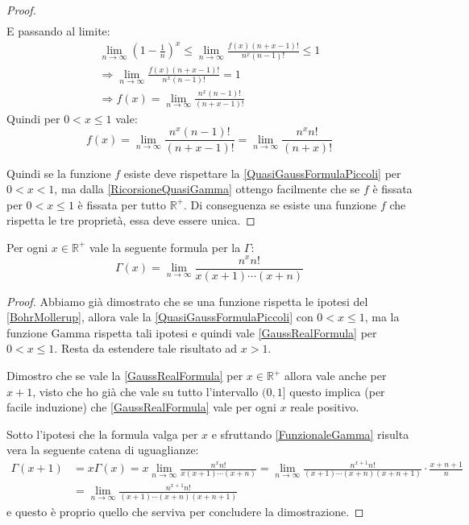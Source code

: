 \begin{proof}
\begin{gather*}
	\end{gather*}
	E passando al limite:
	\begin{gather*}
		\lim_{n\to \infty} \left(1-\frac{1}{n}\right)^x \le \lim_{n\to \infty}  \frac{f(x)(n+x-1)!}{n^x(n-1)!} \le 1 \\
		\Longrightarrow \lim_{n\to \infty} \frac{f(x)(n+x-1)!}{n^x(n-1)!}  = 1 \\
		\Longrightarrow f(x) = \lim_{n\to \infty} \frac{n^x(n-1)!}{(n+x-1)!}
	\end{gather*}
	Quindi per $0<x\le 1$ vale:
	\begin{equation}\label{QuasiGaussFormulaPiccoli}
		f(x)=\lim_{n\to \infty} \frac{n^x(n-1)!}{(n+x-1)!}=\lim_{n\to \infty} \frac{n^xn!}{(n+x)!}
	\end{equation}
	
	Quindi se la funzione $f$ esiste deve rispettare la \cref{QuasiGaussFormulaPiccoli} per $0<x<1$, ma dalla \cref{RicorsioneQuasiGamma} 
	ottengo facilmente che se $f$ è fissata per $0<x\le 1$ è fissata per tutto $\mathbb{R^+}$.
	Di conseguenza se esiste una funzione $f$ che rispetta le tre proprietà, essa deve essere unica.
\end{proof}
 
\begin{corollary}\label{GaussFormula}
        Per ogni $x\in\mathbb{R^+}$ vale la seguente formula per la $\Gamma$:
\begin{equation}\label{GaussRealFormula}
        \Gamma(x)=\lim_{n\to \infty} \frac{n^xn!}{x(x+1)\cdots(x+n)}
\end{equation}
\end{corollary}
\begin{proof}
        Abbiamo già dimostrato che se una funzione rispetta le ipotesi del \cref{BohrMollerup}, allora vale la
        \cref{QuasiGaussFormulaPiccoli} con $0<x\le 1$, ma la funzione Gamma rispetta tali ipotesi e quindi vale \cref{GaussRealFormula}
        per $0<x\le 1$.
        Resta da estendere tale risultato ad $x>1$.
        
        Dimostro che se vale la \cref{GaussRealFormula} per $x\in\mathbb{R^+}$ allora vale anche per $x+1$, visto che ho già che vale
        su tutto l'intervallo $(0,1]$ questo implica (per facile induzione) che \cref{GaussRealFormula} vale per ogni $x$ reale positivo.
        
        Sotto l'ipotesi che la formula valga per $x$ e sfruttando \cref{FunzionaleGamma} risulta vera la seguente catena di uguaglianze:
        \begin{equation*}\begin{split}
                \Gamma(x+1) & =x\Gamma(x)=x\lim_{n\to \infty} \frac{n^xn!}{x(x+1)\cdots(x+n)} =
                \lim_{n\to \infty} \frac{n^{x+1}n!}{(x+1)\cdots(x+n)(x+n+1)}\cdot\frac{x+n+1}{n}\\
                & = \lim_{n\to \infty} \frac{n^{x+1}n!}{(x+1)\cdots(x+n)(x+n+1)}
        \end{split}\end{equation*}
        e questo è proprio quello che serviva per concludere la dimostrazione.
\end{proof}

